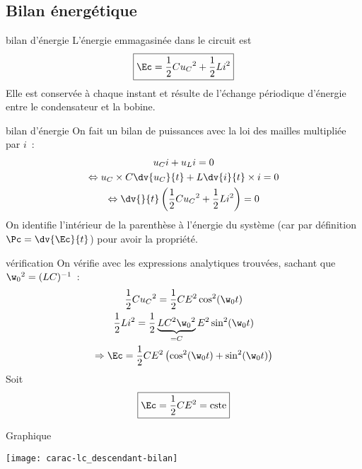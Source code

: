 \documentclass[../main/main.tex]{subfiles}
\begin{document}
\subsection{Bilan énergétique}
\begin{tcbraster}[raster columns=2, raster equal height=rows]
    \begin{prop}[label=prop:lcenerg-décharge]{bilan d'énergie}
        L'énergie emmagasinée dans le circuit est
        \[\boxed{\Ec = \frac{1}{2}Cu_C{}^2 + \frac{1}{2}Li^2}\]
        Elle est conservée à chaque instant et résulte de l'échange périodique
        d'énergie entre le condensateur et la bobine.
    \end{prop}
    \begin{demo}[label=demo:rcenerg-charge]{bilan d'énergie}
        On fait un bilan de puissances avec la loi des mailles multipliée par $i$~:
        \begin{gather*}
            u_Ci + u_Li = 0\\
            \Leftrightarrow u_C\times C \dv{u_C}{t} + L \dv{i}{t}\times i = 0\\
            \Leftrightarrow \dv{}{t} \left( \frac{1}{2}Cu_C{}^2 + \frac{1}{2}Li^2 \right) = 0
        \end{gather*}
        On identifie l'intérieur de la parenthèse à l'énergie du système (car
        par définition $\Pc = \dv{\Ec}{t}$) pour avoir la propriété.
    \end{demo}
    \begin{impl}[label=impl]{vérification}
        On vérifie avec les expressions analytiques trouvées, sachant que
        $\w_0{}^2 = (LC)^{-1}$~:
        \begin{gather*}
            \frac{1}{2}Cu_C{}^2 = \frac{1}{2}CE^2\cos^2(\w_0t)\\
            \frac{1}{2}Li^2 =
            \frac{1}{2}\underbrace{LC^{2}\w_0{}^2}_{=C}E^2\sin^2(\w_0t)\\
            \Rightarrow \Ec = \frac{1}{2}CE^2 \left( \cos^2(\w_0t) +
            \sin^2(\w_0t) \right)
        \end{gather*}
        Soit
        \begin{equation*}
            \boxed{\Ec = \frac{1}{2}CE^2 = \text{cste}}
        \end{equation*}
    \end{impl}
    \begin{NCexem}[width=\linewidth]{Graphique}
        \begin{center}
            \texttt{[image: carac-lc\_descendant-bilan]}
        \end{center}
    \end{NCexem}
\end{tcbraster}
\end{document}

